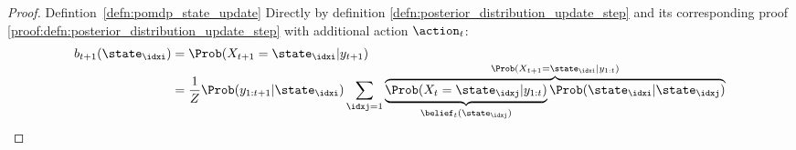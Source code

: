 \begin{proofbox}\nospacing
  \begin{proof}Defintion~\ref{defn:pomdp_state_update}\label{proof:defn:pomdp_state_update}
    Directly by definition \ref{defn:posterior_distribution_update_step}
    and its corresponding proof \ref{proof:defn:posterior_distribution_update_step} with additional action $\action_{t}$:
    \begin{align*}
      b_{t+1}(\state_{\idxi})&=\Prob(X_{t+1}=\state_{\idxi}|y_{t+1})\\[-1\jot]
      &=\frac{1}{Z}\Prob(y_{1:t+1}|\state_{\idxi})\sum_{\idxj=1}\overbrace{\underbrace{\Prob(X_{t}=\state_{\idxj}|y_{1:t})}_{\belief_{t}(\state_{\idxj})}\Prob(\state_{\idxi}|\state_{\idxj})}^{\Prob(X_{t+1}=\state_{\idxi}|y_{1:t})}
    \end{align*}
  \end{proof}
\end{proofbox}


